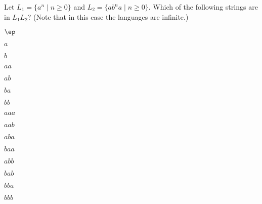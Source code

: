 Let $L_1 = \{a^n \mid n \geq 0\}$ and $L_2 = \{ab^na \mid n \geq 0\}$.
Which of the following strings are in $L_1 L_2$?
(Note that in this case the languages are infinite.)
\begin{tightlist}
\item $\ep$
\item $a$
\item $b$
\item $aa$
\item $ab$
\item $ba$
\item $bb$
\item $aaa$
\item $aab$
\item $aba$
\item $baa$
\item $abb$
\item $bab$
\item $bba$
\item $bbb$
\end{tightlist}
